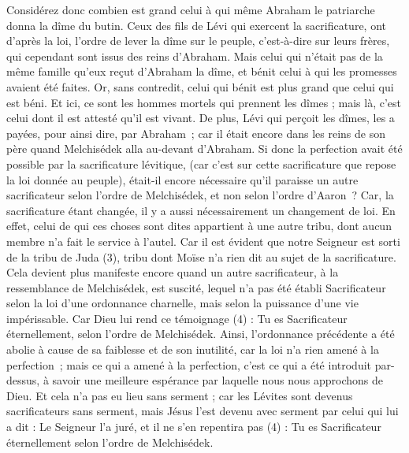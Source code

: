 \begin{multicols}{2}
Considérez donc combien est grand celui à qui même Abraham le patriarche donna la dîme du butin.
Ceux des fils de Lévi qui exercent la sacrificature, ont d’après la loi, l’ordre de lever la dîme sur le peuple, c'est-à-dire sur leurs frères, qui cependant sont issus des reins d'Abraham.
Mais celui qui n’était pas de la même famille qu’eux reçut d’Abraham la dîme, et bénit celui à qui les promesses avaient été faites.
Or, sans contredit, celui qui bénit est plus grand que celui qui est béni.
Et ici, ce sont les hommes mortels qui prennent les dîmes ; mais là, c’est celui dont il est attesté qu’il est vivant.
De plus, Lévi qui perçoit les dîmes, les a payées, pour ainsi dire, par Abraham ;
car il était encore dans les reins de son père quand Melchisédek alla au-devant d’Abraham.
Si donc la perfection avait été possible par la sacrificature lévitique, (car c'est sur cette sacrificature que repose la loi donnée au peuple), était-il encore nécessaire qu’il paraisse un autre sacrificateur selon l'ordre de Melchisédek, et non selon l'ordre d'Aaron ?
Car, la sacrificature étant changée, il y a aussi nécessairement un changement de loi.
En effet, celui de qui ces choses sont dites appartient à une autre tribu, dont aucun membre n'a fait le service à l'autel.
Car il est évident que notre Seigneur est sorti de la tribu de Juda (3), tribu dont Moïse n'a rien dit au sujet de la sacrificature.
Cela devient plus manifeste encore quand un autre sacrificateur, à la ressemblance de Melchisédek, est suscité,
lequel n'a pas été établi Sacrificateur selon la loi d’une ordonnance charnelle, mais selon la puissance d’une vie impérissable.
Car Dieu lui rend ce témoignage (4) : Tu es Sacrificateur éternellement, selon l'ordre de Melchisédek.
Ainsi, l’ordonnance précédente a été abolie à cause de sa faiblesse et de son inutilité,
car la loi n’a rien amené à la perfection ; mais ce qui a amené à la perfection, c’est ce qui a été introduit par-dessus, à savoir une meilleure espérance par laquelle nous nous approchons de Dieu.
Et cela n’a pas eu lieu sans serment ;
car les Lévites sont devenus sacrificateurs sans serment, mais Jésus l’est devenu avec serment par celui qui lui a dit : Le Seigneur l'a juré, et il ne s'en repentira pas (4) : Tu es Sacrificateur éternellement selon l'ordre de Melchisédek.

\end{multicols}
